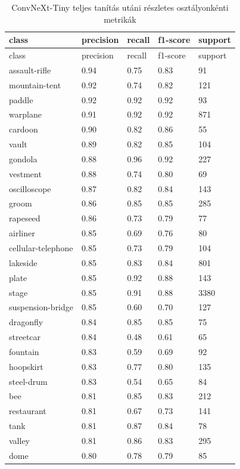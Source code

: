 \begin{center}
\begin{longtable}{lllll}
\caption{ConvNeXt-Tiny teljes tanítás utáni részletes osztályonkénti metrikák}\label{tab:phase2_ConvNeXt-Tiny_class_table}\\
\toprule
class & precision & recall & f1-score & support \\
\midrule
\endfirsthead
\toprule
class & precision & recall & f1-score & support \\
\midrule
\endhead
assault-rifle & 0.94 & 0.75 & 0.83 & 91 \\
mountain-tent & 0.92 & 0.74 & 0.82 & 121 \\
paddle & 0.92 & 0.92 & 0.92 & 93 \\
warplane & 0.91 & 0.92 & 0.92 & 871 \\
cardoon & 0.90 & 0.82 & 0.86 & 55 \\
vault & 0.89 & 0.82 & 0.85 & 104 \\
gondola & 0.88 & 0.96 & 0.92 & 227 \\
vestment & 0.88 & 0.74 & 0.80 & 69 \\
oscilloscope & 0.87 & 0.82 & 0.84 & 143 \\
groom & 0.86 & 0.85 & 0.85 & 285 \\
rapeseed & 0.86 & 0.73 & 0.79 & 77 \\
airliner & 0.85 & 0.69 & 0.76 & 80 \\
cellular-telephone & 0.85 & 0.73 & 0.79 & 104 \\
lakeside & 0.85 & 0.83 & 0.84 & 801 \\
plate & 0.85 & 0.92 & 0.88 & 143 \\
stage & 0.85 & 0.91 & 0.88 & 3380 \\
suspension-bridge & 0.85 & 0.60 & 0.70 & 127 \\
dragonfly & 0.84 & 0.85 & 0.85 & 75 \\
streetcar & 0.84 & 0.48 & 0.61 & 65 \\
fountain & 0.83 & 0.59 & 0.69 & 92 \\
hoopskirt & 0.83 & 0.77 & 0.80 & 135 \\
steel-drum & 0.83 & 0.54 & 0.65 & 84 \\
bee & 0.81 & 0.85 & 0.83 & 212 \\
restaurant & 0.81 & 0.67 & 0.73 & 141 \\
tank & 0.81 & 0.87 & 0.84 & 78 \\
valley & 0.81 & 0.86 & 0.83 & 295 \\
dome & 0.80 & 0.78 & 0.79 & 85 \\

\end{longtable}
\end{center}
